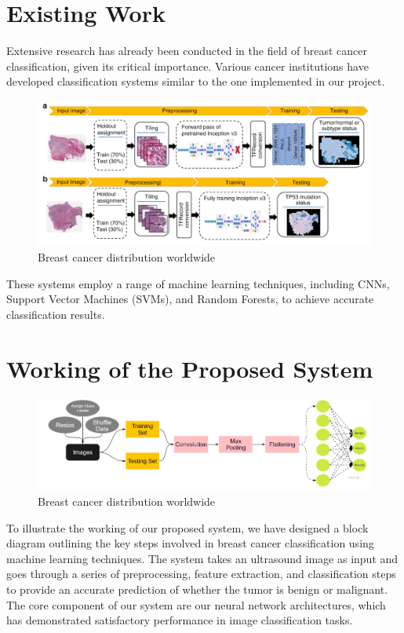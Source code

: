 \documentclass{article}
\begin{document}
\section{Existing Work}
Extensive research has already been conducted in the field of breast cancer classification, given its critical importance. Various cancer institutions have developed classification systems similar to the one implemented in our project. 
\begin{figure}[htbp]
    \centering
    \caption{Breast cancer distribution worldwide}
    \includegraphics[width=\linewidth]{pic2.png}
\end{figure}
These systems employ a range of machine learning techniques, including CNNs, Support Vector Machines (SVMs), and Random Forests, to achieve accurate classification results.

\section{Working of the Proposed System}
\begin{figure}[htbp]
    \centering
    \caption{Breast cancer distribution worldwide}
    \includegraphics[width=\linewidth]{pic3.png}
\end{figure}
To illustrate the working of our proposed system, we have designed a block diagram outlining the key steps involved in breast cancer classification using machine learning techniques. The system takes an ultrasound image as input and goes through a series of preprocessing, feature extraction, and classification steps to provide an accurate prediction of whether the tumor is benign or malignant. The core component of our system are our neural network architectures, which has demonstrated satisfactory performance in image classification tasks.
\end{document}

